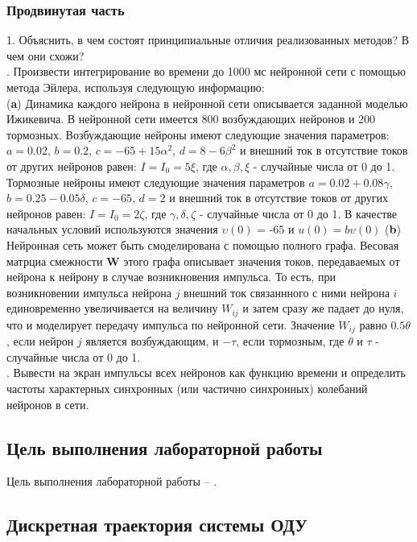 \subsubsection*{Продвинутая часть}
\hspace*{\parindent}1. Объяснить, в чем состоят принципиальные отличия реализованных методов? В чем они схожи? \\
. Произвести интегрирование во времени до 1000 мс нейронной сети с помощью метода Эйлера, используя следующую информацию: \\
\indent(\textbf{a}) Динамика каждого нейрона в нейронной сети описывается заданной моделью Ижикевича. В нейронной сети имеется 800 возбуждающих нейронов и 200 тормозных. Возбуждающие нейроны имеют следующие значения параметров: $a=0.02$, $b = 0.2$, $c = -65 + 15 \alpha^2$, $d = 8 - 6\beta^2$ и внешний ток в отсутствие токов от других нейронов равен: $I = I_0 = 5\xi$, где $\alpha, \beta, \xi$ - случайные числа от 0 до 1. Тормозные нейроны имеют следующие значения параметров $a=0.02 + 0.08\gamma$, $b = 0.25 - 0.05 \delta$, $c = -65$, $d = 2$ и внешний ток в отсутствие токов от других нейронов равен: $I = I_0 = 2\zeta$, где $\gamma, \delta, \zeta $ - случайные числа от 0 до 1. В качестве начальных условий используются значения $\upsilon(0)$ = -65 и $u(0) = b\upsilon(0)$
\indent(\textbf{b}) Нейронная сеть может быть смоделирована с помощью полного графа. Весовая матрциа смежности \textbf{W} этого графа описывает значения токов, передаваемых от нейрона к нейрону в случае возникновения импульса. То есть, при возникновении импульса нейрона $j$ внешний ток связаннного с ними нейрона $i$ единовременно увеличивается на величину $W_{ij}$ и затем сразу же падает до нуля, что и моделирует передачу импульса по нейронной сети. Значение $W_{ij}$ равно $0.5\theta$, если нейрон $j$ является возбуждающим, и $-\tau$, если тормозным, где $\theta$ и $\tau$  - случайные числа от 0 до 1. \\
. Вывести на экран импульсы всех нейронов как функцию времени и определить частоты характерных синхронных (или частично синхронных) колебаний нейронов в сети.
\subsection{Цель выполнения лабораторной работы}

Цель выполнения лабораторной работы -- \GoalOfResearch.
\subsection{Дискретная траектория системы ОДУ}
